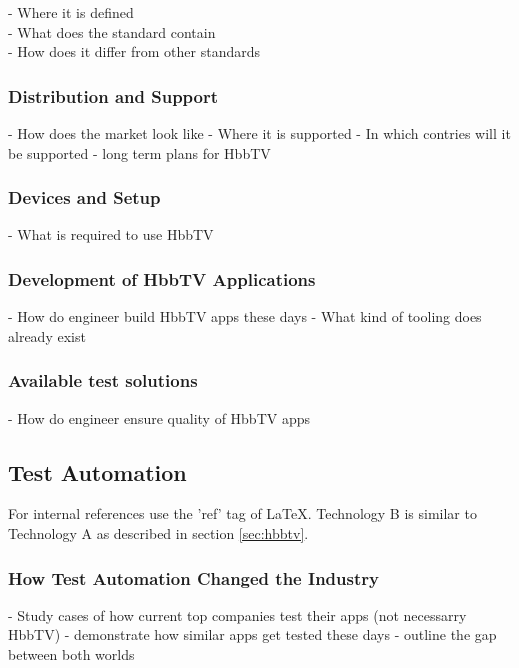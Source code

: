 - Where it is defined\\
- What does the standard contain\\
- How does it differ from other standards

\subsubsection{Distribution and Support\label{sec:distandsup}}

- How does the market look like
- Where it is supported
- In which contries will it be supported
- long term plans for HbbTV

\subsubsection{Devices and Setup\label{sec:deviceandsetup}}

- What is required to use HbbTV

\subsubsection{Development of HbbTV Applications\label{sec:devofhbbtv}}

- How do engineer build HbbTV apps these days
- What kind of tooling does already exist

\subsubsection{Available test solutions\label{sec:availabletestsolutions}}

- How do engineer ensure quality of HbbTV apps

\subsection{Test Automation\label{sec:testautomation}}

For internal references use the 'ref' tag of LaTeX. Technology B is similar to Technology A
as described in section \ref{sec:hbbtv}.

\subsubsection{How Test Automation Changed the Industry\label{sec:howitchanged}}

- Study cases of how current top companies test their apps (not necessarry HbbTV)
- demonstrate how similar apps get tested these days
- outline the gap between both worlds

